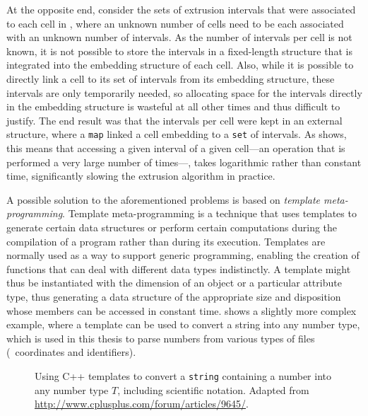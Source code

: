At the opposite end, consider the sets of extrusion intervals that were associated to each cell in , where an unknown number of cells need to be each associated with an unknown number of intervals.
As the number of intervals per cell is not known, it is not possible to store the intervals in a fixed-length structure that is integrated into the embedding structure of each cell.
Also, while it is possible to directly link a cell to its set of intervals from its embedding structure, these intervals are only temporarily needed, so allocating space for the intervals directly in the embedding structure is wasteful at all other times and thus difficult to justify.
The end result was that the intervals per cell were kept in an external structure, where a \texttt{map} linked a cell embedding to a \texttt{set} of intervals.
As  shows, this means that accessing a given interval of a given cell---an operation that is performed a very large number of times---, takes logarithmic rather than constant time, significantly slowing the extrusion algorithm in practice.

A possible solution to the aforementioned problems is based on \emph{template meta-programming}.
Template meta-programming is a technique that uses templates to generate certain data structures or perform certain computations during the compilation of a program rather than during its execution.
Templates are normally used as a way to support generic programming, enabling the creation of functions that can deal with different data types indistinctly.
A template might thus be instantiated with the dimension of an object or a particular attribute type, thus generating a data structure of the appropriate size and disposition whose members can be accessed in constant time.
 shows a slightly more complex example, where a template can be used to convert a string into any number type, which is used in this thesis to parse numbers from various types of files (\eg\ coordinates and identifiers).
\begin{figure}[tb]
\centering
\small

\caption[Using C++ templates to convert a \texttt{string} into any number type]{Using C++ templates to convert a \texttt{string} containing a number into any number type $T$, including scientific notation. Adapted from \url{http://www.cplusplus.com/forum/articles/9645/}.}
\label{fig:template-conversion}
\end{figure}

